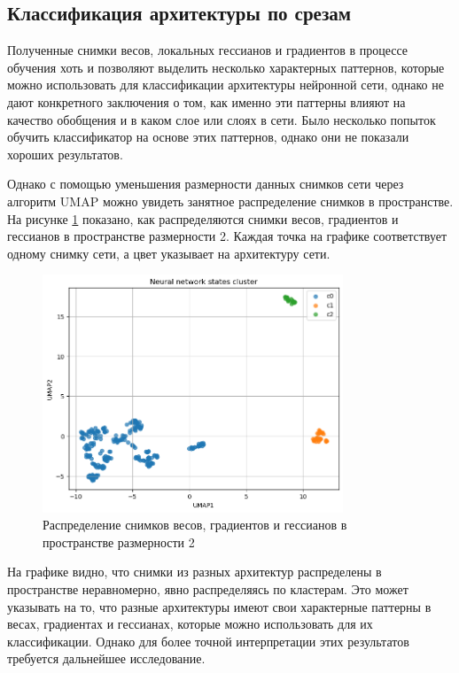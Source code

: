 \documentclass[a4paper,12pt]{article}
\begin{document}
\subsection{Классификация архитектуры по срезам}

Полученные снимки весов, локальных гессианов и градиентов в процессе обучения хоть и позволяют выделить
несколько характерных паттернов, которые можно использовать для классификации архитектуры нейронной сети,
однако не дают конкретного заключения о том, как именно эти паттерны влияют на качество обобщения и в каком
слое или слоях в сети. Было несколько попыток обучить классификатор на основе этих паттернов, однако они не
показали хороших результатов.

Однако с помощью уменьшения размерности данных снимков сети через алгоритм UMAP можно увидеть занятное
распределение снимков в пространстве. На рисунке \ref{fig:umap} показано, как распределяются снимки весов,
градиентов и гессианов в пространстве размерности 2. Каждая точка на графике соответствует одному снимку
сети, а цвет указывает на архитектуру сети.
\begin{figure}[ht]
  \centering
  \includegraphics[width=0.8\textwidth]{umap_visualization.png}
  \caption{Распределение снимков весов, градиентов и гессианов в пространстве размерности 2}
  \label{fig:umap}
\end{figure}

На графике видно, что снимки из разных архитектур распределены в пространстве неравномерно, явно
распределяясь по кластерам. Это может указывать на то, что разные архитектуры имеют свои характерные паттерны
в весах, градиентах и гессианах, которые можно использовать для их классификации. Однако для более точной
интерпретации этих результатов требуется дальнейшее исследование.
\end{document}
